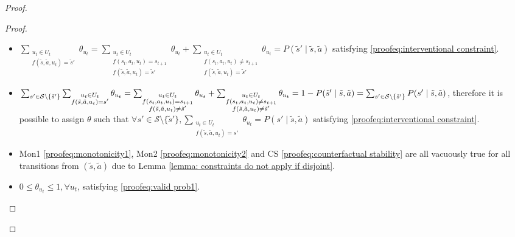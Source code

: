 \begin{proof}
\begin{proof}
\begin{itemize}
    \item $\sum_{\substack{u_t \in U_t \\f(\tilde{s}, \tilde{a}, u_t) = \tilde{s}'}} \theta_{u_t} = \sum_{\substack{u_t \in U_t \\f(s_t, a_t, u_t) = s_{t+1} \\ f(\tilde{s}, \tilde{a}, u_t) = \tilde{s}'}} \theta_{u_t} + \sum_{\substack{u_t \in U_t \\f(s_t, a_t, u_t) \neq s_{t+1} \\ f(\tilde{s}, \tilde{a}, u_t) = \tilde{s}'}} \theta_{u_t} = P(\tilde{s}' \mid \tilde{s}, \tilde{a})$ satisfying \eqref{proofeq:interventional constraint}.
    
    \item $\sum_{s' \in \mathcal{S}\setminus\{\tilde{s}'\}}\sum_{\substack{u_t \in U_t \\f(\tilde{s}, \tilde{a}, u_t) = s'}} \theta_{u_t} = \sum_{\substack{u_t \in U_t \\f(s_t, a_t, u_t) = s_{t+1} \\ f(\tilde{s}, \tilde{a}, u_t) \neq \tilde{s}'}} \theta_{u_t} + \sum_{\substack{u_t \in U_t \\f(s_t, a_t, u_t) \neq s_{t+1} \\ f(\tilde{s}, \tilde{a}, u_t) \neq \tilde{s}'}} \theta_{u_t} \\= 1 - P(\tilde{s}' \mid \tilde{s}, \tilde{a}) = \sum_{s' \in \mathcal{S}\setminus\{\tilde{s}'\}}P(s' \mid \tilde{s}, \tilde{a})$, therefore it is possible to assign $\theta$ such that $\forall s' \in \mathcal{S}\setminus\{\tilde{s}'\}, \sum_{\substack{u_t \in U_t \\ f(\tilde{s}, \tilde{a}, u_t) = s'}}{\theta_{u_t}} = P(s' \mid \tilde{s}, \tilde{a})$ satisfying \eqref{proofeq:interventional constraint}.
    
    \item Mon1 \eqref{proofeq:monotonicity1}, Mon2 \eqref{proofeq:monotonicity2} and CS \eqref{proofeq:counterfactual stability} are all vacuously true for all transitions from $(\tilde{s}, \tilde{a})$ due to Lemma \ref{lemma: constraints do not apply if disjoint}.

    \item $0 \leq \theta_{u_t} \leq 1, \forall u_t$, satisfying \eqref{proofeq:valid prob1}.
    

\end{itemize}
\end{proof}
\end{proof}
